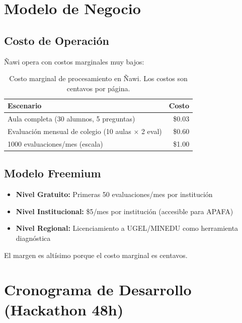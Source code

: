 \documentclass[12pt]{article}
\begin{document}
\section{Modelo de Negocio}

\subsection{Costo de Operación}

Ñawi opera con costos marginales muy bajos:

\begin{table}[H]
\centering
\small
\begin{tabular}{p{5cm} r}
\toprule
\textbf{Escenario} & \textbf{Costo} \\
\midrule
Aula completa (30 alumnos, 5 preguntas) & \$0.03 \\
Evaluación mensual de colegio (10 aulas × 2 eval) & \$0.60 \\
1000 evaluaciones/mes (escala) & \$1.00 \\
\bottomrule
\end{tabular}
\caption{Costo marginal de procesamiento en Ñawi. Los costos son centavos por página.}
\label{tabla:costos}
\end{table}

\subsection{Modelo Freemium}

\begin{itemize}
    \item \textbf{Nivel Gratuito:} Primeras 50 evaluaciones/mes por institución
    \item \textbf{Nivel Institucional:} \$5/mes por institución (accesible para APAFA)
    \item \textbf{Nivel Regional:} Licenciamiento a UGEL/MINEDU como herramienta diagnóstica
\end{itemize}

El margen es altísimo porque el costo marginal es centavos.

\section{Cronograma de Desarrollo (Hackathon 48h)}
\end{document}
